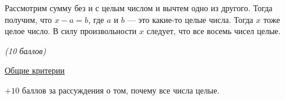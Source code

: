 \solutionSection

Рассмотрим сумму без и с целым числом и вычтем
одно из другого. Тогда получим, что $x - a = b$, где $a$ и $b$ --- это
какие-то целые числа. Тогда $x$ тоже целое число. В силу произвольности 
$x$ следует, что все восемь чисел целые.


\additionalCriteria
\textit{(10 баллов)}

	\underline{Общие критерии}

	$+10$ баллов за рассуждения о том, почему все числа целые.
	
